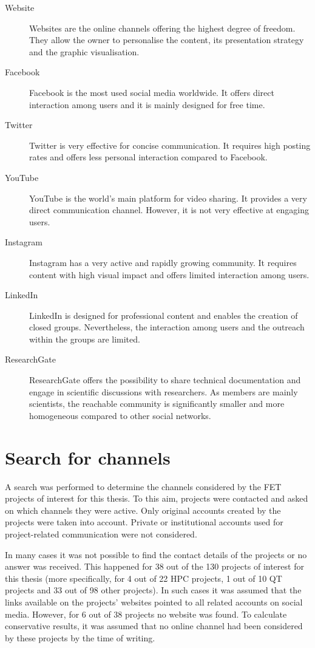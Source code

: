 \begin{description}
 \item [Website] Websites are the online channels offering the highest degree of freedom. They allow the owner to personalise the content, its presentation strategy and the graphic visualisation.
 \item [Facebook] Facebook is the most used social media worldwide. It offers direct interaction among users and it is mainly designed for free time.  
 \item [Twitter] Twitter is very effective for concise communication. It requires high posting rates and offers less personal interaction compared to Facebook.
 \item [YouTube] YouTube is the world's main platform for video sharing. It provides a very direct communication channel. However, it is not very effective at engaging users.
 \item [Instagram] Instagram has a very active and rapidly growing community. It requires content with high visual impact and offers limited interaction among users.
 \item [LinkedIn] LinkedIn is designed for professional content and enables the creation of closed groups. Nevertheless, the interaction among users and the outreach within the groups are limited.
 \item [ResearchGate] ResearchGate offers the possibility to share technical documentation and engage in scientific discussions with researchers. As members are mainly scientists, the reachable community is significantly smaller and more homogeneous compared to other social networks.  
\end{description}

\section{Search for channels} \label{Search_for_channels}
A search was performed to determine the channels considered by the FET projects of interest for this thesis. To this aim, projects were contacted and asked on which channels they were active. Only original accounts created by the projects were taken into account. Private or institutional accounts used for project-related communication were not considered.  

In many cases it was not possible to find the contact details of the projects or no answer was received. This happened for 38 out of the 130 projects of interest for this thesis (more specifically, for 4 out of 22 HPC projects, 1 out of 10 QT projects and 33 out of 98 other projects). In such cases it was assumed that the links available on the projects' websites pointed to all related accounts on social media. However, for 6 out of 38 projects no website was found. To calculate conservative results, it was assumed that no online channel had been considered by these projects by the time of writing.

